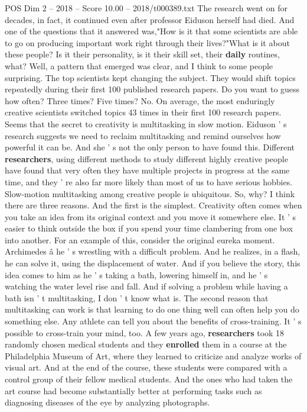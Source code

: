 \begin{textsample}{POS Dim 2 – 2018 – Score 10.00 – 2018/t000389.txt}
The research went on for decades, in fact, it continued even after professor Eiduson herself had died.
And one of the questions that it answered was,"How is it that some scientists are able to go on producing important work right through their lives?"What is it about these people?
Is it their personality, is it their skill set, their \textbf{daily} routines, what?
Well, a pattern that emerged was clear, and I think to some people surprising.
The top scientists kept changing the subject.
They would shift topics repeatedly during their first 100 published research papers.
Do you want to guess how often?
Three times?
Five times?
No.
On average, the most enduringly creative scientists switched topics 43 times in their first 100 research papers.
Seems that the secret to creativity is multitasking in slow motion.
Eiduson ' s research suggests we need to reclaim multitasking and remind ourselves how powerful it can be.
And she ' s not the only person to have found this.
Different \textbf{researchers}, using different methods to study different highly creative people have found that very often they have multiple projects in progress at the same time, and they ' re also far more likely than most of us to have serious hobbies.
Slow-motion multitasking among creative people is ubiquitous.
So, why?
I think there are three reasons.
And the first is the simplest.
Creativity often comes when you take an idea from its original context and you move it somewhere else.
It ' s easier to think outside the box if you spend your time clambering from one box into another.
For an example of this, consider the original eureka moment.
Archimedes â he ' s wrestling with a difficult problem.
And he realizes, in a flash, he can solve it, using the displacement of water.
And if you believe the story, this idea comes to him as he ' s taking a bath, lowering himself in, and he ' s watching the water level rise and fall.
And if solving a problem while having a bath isn ' t multitasking, I don ' t know what is.
The second reason that multitasking can work is that learning to do one thing well can often help you do something else.
Any athlete can tell you about the benefits of cross-training.
It ' s possible to cross-train your mind, too.
A few years ago, \textbf{researchers} took 18 randomly chosen medical students and they \textbf{enrolled} them in a course at the Philadelphia Museum of Art, where they learned to criticize and analyze works of visual art.
And at the end of the course, these students were compared with a control group of their fellow medical students.
And the ones who had taken the art course had become substantially better at performing tasks such as diagnosing diseases of the eye by analyzing photographs.

\end{textsample}
